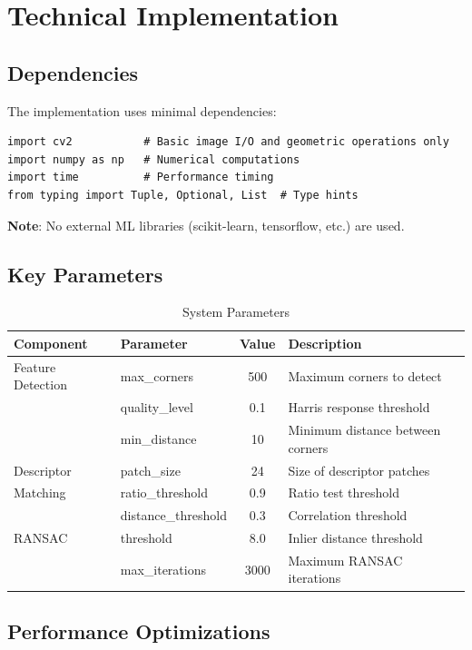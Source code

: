 \documentclass[12pt,a4paper]{article}
\begin{document}
\section{Technical Implementation}

\subsection{Dependencies}
The implementation uses minimal dependencies:

\begin{lstlisting}[caption=Project Dependencies]
import cv2           # Basic image I/O and geometric operations only
import numpy as np   # Numerical computations
import time          # Performance timing
from typing import Tuple, Optional, List  # Type hints
\end{lstlisting}

\textbf{Note}: No external ML libraries (scikit-learn, tensorflow, etc.) are used.

\subsection{Key Parameters}

\begin{table}[h]
\centering
\caption{System Parameters}
\begin{tabular}{llcl}
\toprule
\textbf{Component} & \textbf{Parameter} & \textbf{Value} & \textbf{Description} \\
\midrule
Feature Detection & max\_corners & 500 & Maximum corners to detect \\
& quality\_level & 0.1 & Harris response threshold \\
& min\_distance & 10 & Minimum distance between corners \\
Descriptor & patch\_size & 24 & Size of descriptor patches \\
Matching & ratio\_threshold & 0.9 & Ratio test threshold \\
& distance\_threshold & 0.3 & Correlation threshold \\
RANSAC & threshold & 8.0 & Inlier distance threshold \\
& max\_iterations & 3000 & Maximum RANSAC iterations \\
\bottomrule
\end{tabular}
\end{table}

\subsection{Performance Optimizations}
\end{document}

